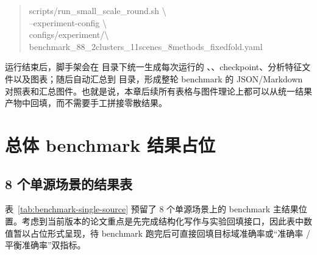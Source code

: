 \begin{quote}
\small
\ttfamily
scripts/run\_small\_scale\_round.sh \textbackslash\\
--experiment-config \textbackslash\\
configs/experiment/\textbackslash\\
benchmark\_88\_2clusters\_11scenes\_8methods\_fixedfold.yaml
\end{quote}

运行结束后，脚手架会在  目录下统一生成每次运行的
、、checkpoint、分析特征文件以及图表；随后自动汇总到
目录，形成整轮 benchmark 的 JSON/Markdown 对照表和汇总图件。也就是说，本章后续所有表格与图件理论上都可以从统一结果产物中回填，而不需要手工拼接零散结果。

\section{总体 benchmark 结果占位}
\subsection{8 个单源场景的结果表}
表~\ref{tab:benchmark-single-source} 预留了 8 个单源场景上的 benchmark 主结果位置。考虑到当前版本的论文重点是先完成结构化写作与实验回填接口，因此表中数值暂以占位形式呈现，待 benchmark 跑完后可直接回填目标域准确率或“准确率 / 平衡准确率”双指标。

\begin{table}[htbp]
\centering
\caption{8 个单源场景上的主结果（占位）}
\label{tab:benchmark-single-source}
\scriptsize
{}
\normalsize
\end{table}

